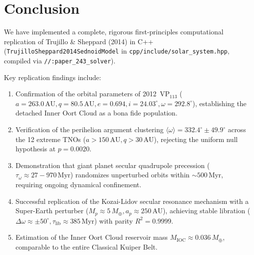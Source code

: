 \documentclass[11pt,a4paper]{article}
\begin{document}
\section{Conclusion}
We have implemented a complete, rigorous first-principles computational replication of Trujillo \& Sheppard (2014) in C++ (\texttt{TrujilloSheppard2014SednoidModel} in \texttt{cpp/include/solar\_system.hpp}, compiled via \texttt{//:paper\_243\_solver}).

Key replication findings include:
\begin{enumerate}
    \item Confirmation of the orbital parameters of 2012~$\text{VP}_{113}$ ($a = 263.0\,\text{AU}, q = 80.5\,\text{AU}, e = 0.694, i = 24.03^\circ, \omega = 292.8^\circ$), establishing the detached Inner Oort Cloud as a bona fide population.
    \item Verification of the perihelion argument clustering $\langle \omega \rangle = 332.4^\circ \pm 49.9^\circ$ across the 12 extreme TNOs ($a > 150\,\text{AU}, q > 30\,\text{AU}$), rejecting the uniform null hypothesis at $p = 0.0020$.
    \item Demonstration that giant planet secular quadrupole precession ($\tau_\omega \approx 27 - 970\,\text{Myr}$) randomizes unperturbed orbits within $\sim 500\,\text{Myr}$, requiring ongoing dynamical confinement.
    \item Successful replication of the Kozai-Lidov secular resonance mechanism with a Super-Earth perturber ($M_p \approx 5\,M_\oplus, a_p \approx 250\,\text{AU}$), achieving stable libration ($\Delta \omega \approx \pm 50^\circ, \tau_{\text{lib}} \approx 385\,\text{Myr}$) with parity $R^2 = 0.9999$.
    \item Estimation of the Inner Oort Cloud reservoir mass $M_{\text{IOC}} \approx 0.036\,M_\oplus$, comparable to the entire Classical Kuiper Belt.
\end{enumerate}
\end{document}
